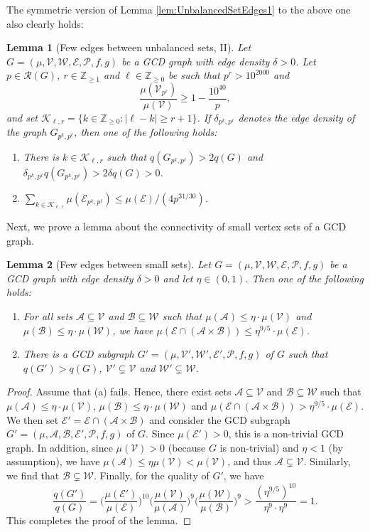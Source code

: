 \documentclass[12pt]{amsart}
\numberwithin{equation}{section}
\newtheorem{lem}{Lemma}[section]
\theoremstyle{definition}
\theoremstyle{remark}
\newcommand{\Z}{\mathbb{Z}}
\newcommand{\CA}{\mathcal{A}}
\newcommand{\CB}{\mathcal{B}}
\newcommand{\CE}{\mathcal{E}}
\newcommand{\CK}{\mathcal{K}}
\newcommand{\CP}{\mathcal{P}}
\newcommand{\CR}{\mathcal{R}}
\newcommand{\CV}{\mathcal{V}}
\newcommand{\CW}{\mathcal{W}}
\renewcommand{\le}{\leqslant}
\renewcommand{\ge}{\geqslant}
\begin{document}
The symmetric version of Lemma \ref{lem:UnbalancedSetEdges1} to the above one also clearly holds:


\begin{lem}[Few edges between unbalanced sets, II]\label{lem:UnbalancedSetEdges2}
Let $G=(\mu,\CV,\CW,\CE,\CP,f,g)$ be a GCD graph with edge density $\delta>0$. Let $p\in\CR(G)$,  $r\in\mathbb{Z}_{\ge 1}$ and $\ell\in\Z_{\ge0}$ be such that $p^r>10^{2000}$ and
\[
\frac{\mu(\CV_{p^\ell})}{\mu(\CV)}\ge 1-\frac{10^{40}}{p},
\]
and set $\CK_{\ell,r}=\{k\in\Z_{\ge0}:|\ell-k|\ge r+1\}$. If $\delta_{p^k,p^\ell}$ denotes the edge density of the graph $G_{p^k,p^\ell}$, then one of the following holds:
\begin{enumerate}
\item There is $k\in\CK_{\ell,r}$ such that $q(G_{p^k,p^\ell})>2q(G)$ and $\delta_{p^k,p^\ell}q(G_{p^k,p^\ell})>2\delta q(G)>0$.
\item $\sum_{k\in\CK_{\ell,r}}  \mu(\CE_{p^k,p^\ell})\le\mu(\CE)/(4p^{31/30})$.
\end{enumerate}
\end{lem}

Next, we prove a lemma about the connectivity of small vertex sets of a GCD graph.

\begin{lem}[Few edges between small sets]\label{lem:SmallSetEdges}
Let	$G=(\mu,\CV,\CW,\CE,\CP,f,g)$ be a GCD graph with edge density $\delta>0$ and let $\eta\in(0,1)$. Then one of the following holds:
\begin{enumerate}
	\item For all sets $\CA\subseteq\CV$ and $\CB\subseteq\CW$ such that $\mu(\CA)\le \eta\cdot  \mu(\CV)$ and  $\mu(\CB)\le\eta \cdot \mu(\CW)$, we have $\mu(\CE\cap(\CA\times\CB))\le \eta^{9/5}\cdot \mu(\CE)$.
	\item There is a GCD subgraph $G'=(\mu,\CV',\CW',\CE',\CP,f,g)$ of $G$ such that $q(G')>q(G)$,  $\CV'\subsetneq \CV$ and $\CW'\subsetneq \CW$.
\end{enumerate}
\end{lem}

\begin{proof}
Assume that (a) fails. Hence, there exist sets $\CA\subseteq\CV$ and $\CB\subseteq\CW$ such that $\mu(\CA)\le\eta \cdot \mu(\CV)$, $\mu(\CB)\le\eta \cdot \mu(\CW)$ and $\mu(\CE\cap(\CA\times\CB))>\eta^{9/5}\cdot \mu(\CE)$. We then set $\CE'=\CE\cap(\CA\times \CB)$ and consider the GCD subgraph $G'=(\mu,\CA,\CB,\CE',\CP,f,g)$ of $G$. Since $\mu(\CE')>0$, this is a non-trivial GCD graph. In addition, since $\mu(\CV)>0$ (because $G$ is non-trivial) and $\eta<1$ (by assumption), we have $\mu(\CA)\le \eta \mu(\CV)<\mu(\CV)$, and thus $\CA\subsetneq \CV$. Similarly, we find that $\CB\subsetneq \CW$. Finally, for the quality of $G'$, we have
\[
\frac{q(G')}{q(G)}
	= \bigg(\frac{\mu(\CE')}{\mu(\CE)}\bigg)^{10}
	\bigg(\frac{\mu(\CV)}{\mu(\CA)}\bigg)^{9}
	\bigg(\frac{\mu(\CW)}{\mu(\CB)}\bigg)^{9} >\frac{(\eta^{9/5})^{10}}{\eta^9\cdot\eta^9}=1.
\]
This completes the proof of the lemma.
\end{proof}
\end{document}
